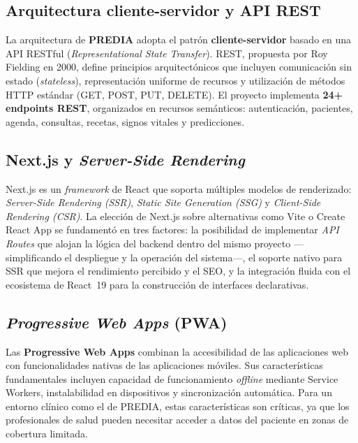 \documentclass[12pt, letterpaper, twoside]{report}
\begin{document}
\subsection{Arquitectura cliente-servidor y API REST}

La arquitectura de \textbf{PREDIA} adopta el patrón \textbf{cliente-servidor} basado en una API RESTful (\textit{Representational State Transfer}). REST, propuesta por Roy Fielding en 2000, define principios arquitectónicos que incluyen comunicación sin estado (\textit{stateless}), representación uniforme de recursos y utilización de métodos HTTP estándar (GET, POST, PUT, DELETE). El proyecto implementa \textbf{24+ endpoints REST}, organizados en recursos semánticos: autenticación, pacientes, agenda, consultas, recetas, signos vitales y predicciones.

\subsection{Next.js y \textit{Server-Side Rendering}}

Next.js es un \textit{framework} de React que soporta múltiples modelos de renderizado: \textit{Server-Side Rendering (SSR)}, \textit{Static Site Generation (SSG)} y \textit{Client-Side Rendering (CSR)}. La elección de Next.js sobre alternativas como Vite o Create React App se fundamentó en tres factores: la posibilidad de implementar \textit{API Routes} que alojan la lógica del backend dentro del mismo proyecto ---simplificando el despliegue y la operación del sistema---, el soporte nativo para SSR que mejora el rendimiento percibido y el SEO, y la integración fluida con el ecosistema de React~19 para la construcción de interfaces declarativas.

\subsection{\textit{Progressive Web Apps} (PWA)}

Las \textbf{Progressive Web Apps} combinan la accesibilidad de las aplicaciones web con funcionalidades nativas de las aplicaciones móviles. Sus características fundamentales incluyen capacidad de funcionamiento \textit{offline} mediante Service Workers, instalabilidad en dispositivos y sincronización automática. Para un entorno clínico como el de PREDIA, estas características son críticas, ya que los profesionales de salud pueden necesitar acceder a datos del paciente en zonas de cobertura limitada.
\end{document}
